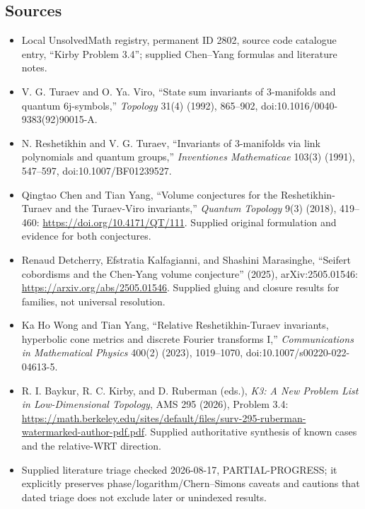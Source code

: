 \documentclass[11pt]{article}
\begin{document}
\subsection{Sources}
\begin{itemize}
\item Local UnsolvedMath registry, permanent ID 2802, source code catalogue entry, ``Kirby Problem 3.4''; supplied Chen--Yang formulas and literature notes.
\item [TV92] V. G. Turaev and O. Ya. Viro, ``State sum invariants of 3-manifolds and quantum 6j-symbols,'' \emph{Topology} 31(4) (1992), 865--902, doi:10.1016/0040-9383(92)90015-A.
\item [RT91] N. Reshetikhin and V. G. Turaev, ``Invariants of 3-manifolds via link polynomials and quantum groups,'' \emph{Inventiones Mathematicae} 103(3) (1991), 547--597, doi:10.1007/BF01239527.
\item [CY18] Qingtao Chen and Tian Yang, ``Volume conjectures for the Reshetikhin-Turaev and the Turaev-Viro invariants,'' \emph{Quantum Topology} 9(3) (2018), 419--460: \url{https://doi.org/10.4171/QT/111}. Supplied original formulation and evidence for both conjectures.
\item [DKM25] Renaud Detcherry, Efstratia Kalfagianni, and Shashini Marasinghe, ``Seifert cobordisms and the Chen-Yang volume conjecture'' (2025), arXiv:2505.01546: \url{https://arxiv.org/abs/2505.01546}. Supplied gluing and closure results for families, not universal resolution.
\item [WY23] Ka Ho Wong and Tian Yang, ``Relative Reshetikhin-Turaev invariants, hyperbolic cone metrics and discrete Fourier transforms I,'' \emph{Communications in Mathematical Physics} 400(2) (2023), 1019--1070, doi:10.1007/s00220-022-04613-5.
\item R. I. Baykur, R. C. Kirby, and D. Ruberman (eds.), \emph{K3: A New Problem List in Low-Dimensional Topology}, AMS 295 (2026), Problem 3.4: \url{https://math.berkeley.edu/sites/default/files/surv-295-ruberman-watermarked-author-pdf.pdf}. Supplied authoritative synthesis of known cases and the relative-WRT direction.
\item Supplied literature triage checked 2026-08-17, PARTIAL-PROGRESS; it explicitly preserves phase/logarithm/Chern--Simons caveats and cautions that dated triage does not exclude later or unindexed results.
\end{itemize}
\end{document}
